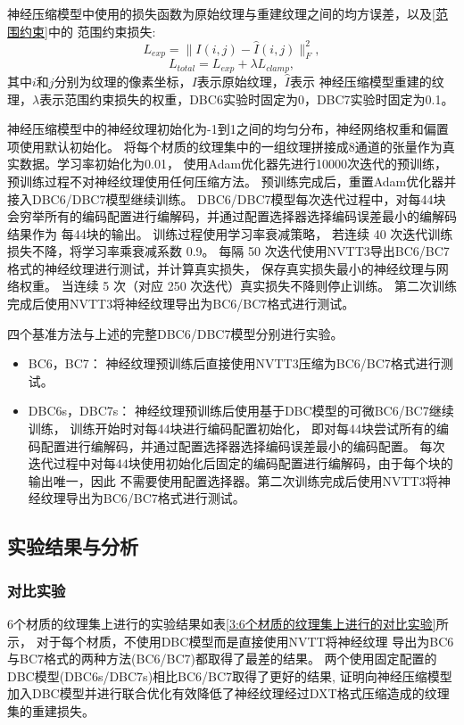 神经压缩模型中使用的损失函数为原始纹理与重建纹理之间的均方误差，以及\ref{范围约束}中的
范围约束损失:
\begin{equation}
    L_{exp}=\| I(i,j) - \hat{I}(i,j) \|^2_F,
\end{equation}
\begin{equation}
    L_{total}=L_{exp}+\lambda L_{clamp},
\end{equation}
其中$i$和$j$分别为纹理的像素坐标，$I$表示原始纹理，$\hat{I}$表示
神经压缩模型重建的纹理，$\lambda$表示范围约束损失的权重，DBC6实验时固定为0，DBC7实验时固定为0.1。

神经压缩模型中的神经纹理初始化为-1到1之间的均匀分布，神经网络权重和偏置项使用默认初始化。
将每个材质的纹理集中的一组纹理拼接成8通道的张量作为真实数据。学习率初始化为0.01，
使用Adam优化器先进行10000次迭代的预训练，预训练过程不对神经纹理使用任何压缩方法。
预训练完成后，重置Adam优化器并接入DBC6/DBC7模型继续训练。
DBC6/DBC7模型每次迭代过程中，对每4\times4块会穷举所有的编码配置进行编解码，并通过配置选择器选择编码误差最小的编解码结果作为
每4\times4块的输出。
训练过程使用学习率衰减策略，
若连续 40 次迭代训练损失不降，将学习率乘衰减系数 0.9。
每隔 50 次迭代使用NVTT3导出BC6/BC7格式的神经纹理进行测试，并计算真实损失，
保存真实损失最小的神经纹理与网络权重。
当连续 5 次（对应 250 次迭代）真实损失不降则停止训练。
第二次训练完成后使用NVTT3将神经纹理导出为BC6/BC7格式进行测试。

四个基准方法与上述的完整DBC6/DBC7模型分别进行实验。

\begin{itemize}
    \item BC6，BC7： 神经纹理预训练后直接使用NVTT3压缩为BC6/BC7格式进行测试。
    \item DBC6s，DBC7s： 神经纹理预训练后使用基于DBC模型的可微BC6/BC7继续训练，
    训练开始时对每4\times4块进行编码配置初始化，
    即对每4\times4块尝试所有的编码配置进行编解码，并通过配置选择器选择编码误差最小的编码配置。
    每次迭代过程中对每4\times4块使用初始化后固定的编码配置进行编解码，由于每个块的输出唯一，因此
    不需要使用配置选择器。第二次训练完成后使用NVTT3将神经纹理导出为BC6/BC7格式进行测试。
\end{itemize}

\subsection{实验结果与分析}

\subsubsection{对比实验}
\label{3:对比实验}
6个材质的纹理集上进行的实验结果如表\ref{3:6个材质的纹理集上进行的对比实验}所示，
对于每个材质，不使用DBC模型而是直接使用NVTT将神经纹理
导出为BC6与BC7格式的两种方法(BC6/BC7)都取得了最差的结果。
两个使用固定配置的DBC模型(DBC6s/DBC7s)相比BC6/BC7取得了更好的结果,
证明向神经压缩模型加入DBC模型并进行联合优化有效降低了神经纹理经过DXT格式压缩造成的纹理集的重建损失。

